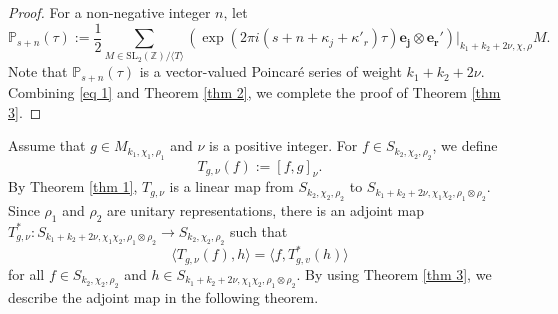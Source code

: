 \documentclass[11pt]{amsart}
\theoremstyle{definition}
\theoremstyle{remark}
\numberwithin{equation}{section}
\renewcommand{\(}{\left(}
\renewcommand{\)}{\right)}
\begin{document}
\begin{proof}
    For a non-negative integer $n$, let
    \[ \mathbb{P}_{s+n}(\tau):=\frac{1}{2}\sum_{M\in \mathrm{SL}_{2}(\mathbb{Z})/\langle T \rangle} \left(\exp(2\pi i (s+n+\kappa_j+\kappa'_r)\tau) \mathbf{e_j}\otimes \mathbf{e_r'}\right)|_{k_1+k_2+2\nu,\chi,\rho}M. \]
    Note that $\mathbb{P}_{s+n}(\tau)$ is a vector-valued Poincar\'e series of weight $k_1+k_2+2\nu$. 
    Combining \eqref{eq 1} and Theorem \ref{thm 2}, we complete the proof of Theorem \ref{thm 3}.
 \end{proof}


Assume that $g\in M_{k_1,\chi_1,\rho_1}$ and $\nu$ is a positive integer.
For $f\in S_{k_2,\chi_2,\rho_2}$, we define 
\[ T_{g,\nu}(f):=[f,g]_{\nu}. \]
By Theorem \ref{thm 1}, $T_{g,\nu}$ is a linear map from $S_{k_2,\chi_2,\rho_2}$ to $S_{k_1+k_2+2\nu,\chi_1\chi_2,\rho_1\otimes \rho_2}$. 
Since $\rho_1$ and $\rho_2$ are unitary representations, there is an adjoint map $T_{g,\nu}^{*}: S_{k_1+k_2+2\nu,\chi_1\chi_2,\rho_1\otimes\rho_2} \to S_{k_2,\chi_2,\rho_2}$ such that 
\[ \langle T_{g,\nu}(f),h \rangle = \langle f, T_{g,v}^{*}(h) \rangle  \]
for all $f\in S_{k_2,\chi_2,\rho_2}$ and $h\in S_{k_1+k_2+2\nu,\chi_1\chi_2,\rho_1\otimes\rho_2}$.
By using Theorem \ref{thm 3}, we describe the adjoint map in the following theorem. 
\end{document}

